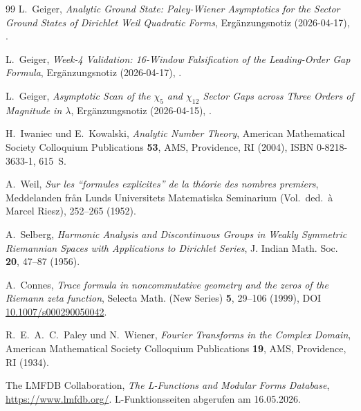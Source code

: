 \documentclass[a4paper,10pt,twocolumn]{article}
\theoremstyle{definition}
\theoremstyle{remark}
\begin{document}
\begin{thebibliography}{99}
L.~Geiger,
\textit{Analytic Ground State: Paley-Wiener Asymptotics for the
Sector Ground States of Dirichlet Weil Quadratic Forms},
Ergänzungsnotiz (2026-04-17),
.

L.~Geiger,
\textit{Week-4 Validation: 16-Window Falsification of the
Leading-Order Gap Formula},
Ergänzungsnotiz (2026-04-17),
.

L.~Geiger,
\textit{Asymptotic Scan of the $\chi_5$ and $\chi_{12}$ Sector Gaps
across Three Orders of Magnitude in $\lambda$},
Ergänzungsnotiz (2026-04-15),
.


H.~Iwaniec und E.~Kowalski,
\textit{Analytic Number Theory},
American Mathematical Society Colloquium Publications \textbf{53},
AMS, Providence, RI (2004), ISBN 0-8218-3633-1, 615~S.

A.~Weil,
\textit{Sur les ``formules explicites'' de la th\'eorie des nombres
premiers},
Meddelanden fr\aa n Lunds Universitets Matematiska Seminarium
(Vol.\ ded.\ \`a Marcel Riesz), 252--265 (1952).

A.~Selberg,
\textit{Harmonic Analysis and Discontinuous Groups in Weakly
Symmetric Riemannian Spaces with Applications to Dirichlet Series},
J. Indian Math. Soc. \textbf{20}, 47--87 (1956).

A.~Connes,
\textit{Trace formula in noncommutative geometry and the zeros of
the Riemann zeta function},
Selecta Math. (New Series) \textbf{5}, 29--106 (1999),
DOI \href{https://doi.org/10.1007/s000290050042}{10.1007/s000290050042}.

R.~E.~A.~C.~Paley und N.~Wiener,
\textit{Fourier Transforms in the Complex Domain},
American Mathematical Society Colloquium Publications \textbf{19},
AMS, Providence, RI (1934).

The LMFDB Collaboration,
\textit{The L-Functions and Modular Forms Database},
\url{https://www.lmfdb.org/}. L-Funktionsseiten abgerufen am 16.05.2026.

\end{thebibliography}
\end{document}
